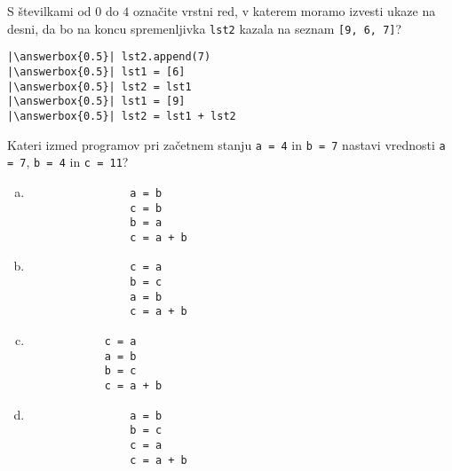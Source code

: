 \documentclass[arhiv, 10pt]{../izpit}
\newcommand{\inlinepy}[1]{\texttt{#1}}
\newcommand{\answerbox}[1]{\framebox{\vphantom{\large M}\hspace{#1cm}}}
\begin{document}
        \naloga*
        \begin{multicols}{2}
        \noindent 
        S številkami od $0$ do $4$ označite vrstni red, v katerem moramo izvesti ukaze na desni, da bo na koncu spremenljivka \inlinepy{lst2} kazala na seznam \inlinepy{[9, 6, 7]}?
    
        \columnbreak
        \noindent
        \begin{verbatim}
|\answerbox{0.5}| lst2.append(7)
|\answerbox{0.5}| lst1 = [6]
|\answerbox{0.5}| lst2 = lst1
|\answerbox{0.5}| lst1 = [9]
|\answerbox{0.5}| lst2 = lst1 + lst2

        \end{verbatim}
        \end{multicols}
    
            
        \naloga*
        
        Kateri izmed programov pri začetnem stanju
            \inlinepy{a = 4} in
            \inlinepy{b = 7}
        nastavi vrednosti
            \inlinepy{a = 7},
            \inlinepy{b = 4} in
            \inlinepy{c = 11}?
    
        \begin{multicols}{4}
        \begin{enumerate}[(a)]
\item 
                \begin{verbatim}
                a = b
                c = b
                b = a
                c = a + b
                \end{verbatim}
            
\item 
                \begin{verbatim}
                c = a
                b = c
                a = b
                c = a + b
                \end{verbatim}
            
\item 
            \begin{verbatim}
            c = a
            a = b
            b = c
            c = a + b
            \end{verbatim}
        
\item 
                \begin{verbatim}
                a = b
                b = c
                c = a
                c = a + b
                \end{verbatim}
            
\end{enumerate}

        \end{multicols}
    
\end{document}
